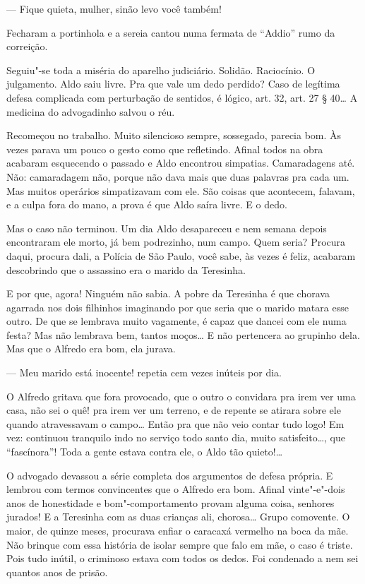 --- Fique quieta, mulher, sinão levo você também!

Fecharam a portinhola e a sereia cantou numa fermata de ``Addio'' rumo
da correição.

Seguiu"-se toda a miséria do aparelho judiciário. Solidão. Raciocínio. O
julgamento. Aldo saiu livre. Pra que vale um dedo perdido? Caso de
legítima defesa complicada com perturbação de sentidos, é lógico, art.
32, art. 27 § 40\ldots{} A medicina do advogadinho salvou o réu.

Recomeçou no trabalho. Muito silencioso sempre, sossegado, parecia bom.
Às vezes parava um pouco o gesto como que refletindo. Afinal todos na
obra acabaram esquecendo o passado e Aldo encontrou simpatias.
Camaradagens até. Não: camaradagem não, porque não dava mais que duas
palavras pra cada um. Mas muitos operários simpatizavam com ele. São
coisas que acontecem, falavam, e a culpa fora do mano, a prova é que
Aldo saíra livre. E o dedo.

Mas o caso não terminou. Um dia Aldo desapareceu e nem semana depois
encontraram ele morto, já bem podrezinho, num campo. Quem seria? Procura
daqui, procura dali, a Polícia de São Paulo, você sabe, às vezes é
feliz, acabaram descobrindo que o assassino era o marido da Teresinha.

E por que, agora! Ninguém não sabia. A pobre da Teresinha é que chorava
agarrada nos dois filhinhos imaginando por que seria que o marido matara
esse outro. De que se lembrava muito vagamente, é capaz que dancei com
ele numa festa? Mas não lembrava bem, tantos moços\ldots{} E não pertencera
ao grupinho dela. Mas que o Alfredo era bom, ela jurava.

--- Meu marido está inocente! repetia cem vezes inúteis por dia.

O Alfredo gritava que fora provocado, que o outro o convidara pra irem
ver uma casa, não sei o quê! pra irem ver um terreno, e de repente se
atirara sobre ele quando atravessavam o campo\ldots{} Então pra que não veio
contar tudo logo! Em vez: continuou tranquilo indo no serviço todo santo
dia, muito satisfeito\ldots{}, que ``fascínora''! Toda a gente estava contra
ele, o Aldo tão quieto!\ldots{}

O advogado devassou a série completa dos argumentos de defesa própria. E
lembrou com termos convincentes que o Alfredo era bom. Afinal
vinte"-e"-dois anos de honestidade e bom"-comportamento provam alguma
coisa, senhores jurados! E a Teresinha com as duas crianças ali,
chorosa\ldots{} Grupo comovente. O maior, de quinze meses, procurava enfiar o
caracaxá vermelho na boca da mãe. Não brinque com essa história de
isolar sempre que falo em mãe, o caso é triste. Pois tudo inútil, o
criminoso estava com todos os dedos. Foi condenado a nem sei quantos
anos de prisão.

